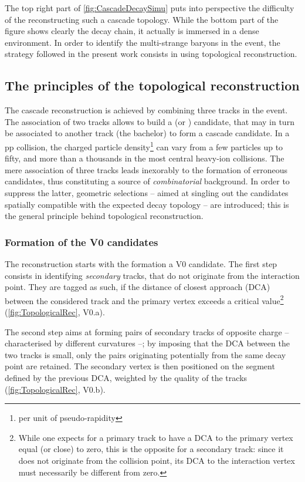The top right part of \fig\ref{fig:CascadeDecaySimu} puts into perspective the difficulty of the reconstructing such a cascade topology. While the bottom part of the figure shows clearly the \rmXiM decay chain, it actually is immersed in a dense environment. In order to identify the multi-strange baryons in the event, the strategy followed in the present work consists in using topological reconstruction.

\subsection{The principles of the topological reconstruction}
\label{subsec:TopoReco}

The cascade reconstruction is achieved by combining three tracks in the event. The association of two tracks allows to build a \rmLambda (or \rmAlambda) candidate, that may in turn be associated to another track (the bachelor) to form a cascade candidate. In a pp collision, the charged particle density\footnote{per unit of pseudo-rapidity} can vary from a few particles up to fifty, and more than a thousands in the most central heavy-ion collisions. The mere association of three tracks leads inexorably to the formation of erroneous candidates, thus constituting a source of \textit{combinatorial} background. In order to suppress the latter, geometric selections -- aimed at singling out the candidates spatially compatible with the expected decay topology -- are introduced; this is the general principle behind topological reconstruction. 

\subsubsection{Formation of the V0 candidates}
\label{subsubsec:V0Formation}

The reconstruction starts with the formation a V0 candidate. The first step consists in identifying \textit{secondary} tracks, that do not originate from the interaction point. They are tagged as such, if the distance of closest approach (DCA) between the considered track and the primary vertex exceeds a critical value\footnote{While one expects for a primary track to have a DCA to the primary vertex equal (or close) to zero, this is the opposite for a secondary track: since it does not originate from the collision point, its DCA to the interaction vertex must necessarily be different from zero.} (\fig\ref{fig:TopologicalRec}, V0.a). 

The second step aims at forming pairs of secondary tracks of opposite charge -- characterised by different curvatures --; by imposing that the DCA between the two tracks is small, only the pairs originating potentially from the same decay point are retained. The secondary vertex is then positioned on the segment defined by the previous DCA, weighted by the quality of the tracks (\fig\ref{fig:TopologicalRec}, V0.b).

